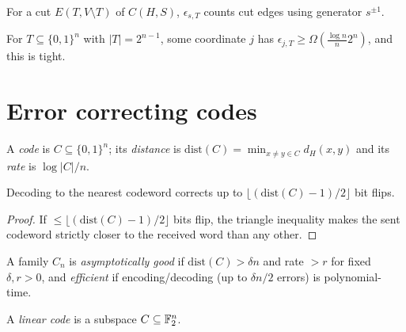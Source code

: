 \begin{definition}
  \label{def:edge-cut-generator}
  For a cut $E(T,V\setminus T)$ of $C(H,S)$, $\epsilon_{s,T}$ counts cut edges
  using generator $s^{\pm1}$.
\end{definition}

\begin{theorem}
  \label{thm:kkl}
  \notready
  For $T\subseteq\{0,1\}^n$ with $|T|=2^{n-1}$, some coordinate $j$ has
  $\epsilon_{j,T}\ge\Omega(\tfrac{\log n}n2^n)$, and this is tight.
\end{theorem}


\chapter{Error correcting codes}

\begin{definition}
  \label{def:ecc}
  A \emph{code} is $C\subseteq\{0,1\}^n$; its \emph{distance} is
  $\mathrm{dist}(C)=\min_{x\neq y\in C}d_H(x,y)$ and its \emph{rate} is
  $\log|C|/n$.
\end{definition}

\begin{claim}
  \label{claim:nearest-decoding}
  Decoding to the nearest codeword corrects up to
  $\lfloor(\mathrm{dist}(C)-1)/2\rfloor$ bit flips.
\end{claim}
\begin{proof}
  If $\le\lfloor(\mathrm{dist}(C)-1)/2\rfloor$ bits flip, the triangle inequality
  makes the sent codeword strictly closer to the received word than any other.
\end{proof}

\begin{definition}
  \label{def:good-code}
  A family $C_n$ is \emph{asymptotically good} if $\mathrm{dist}(C)>\delta n$ and
  rate $>r$ for fixed $\delta,r>0$, and \emph{efficient} if encoding/decoding
  (up to $\delta n/2$ errors) is polynomial-time.
\end{definition}

\begin{definition}
  \label{def:linear-code}
  A \emph{linear code} is a subspace $C\subseteq\mathbb{F}_2^n$.
\end{definition}

